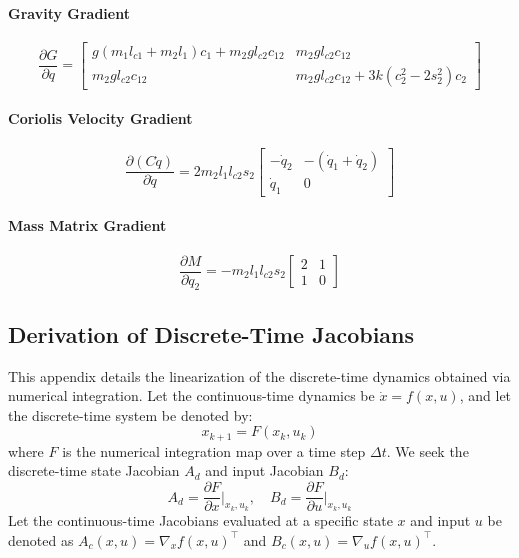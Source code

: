 \paragraph{Gravity Gradient}
\begin{equation}
    \frac{\partial G}{\partial q} = 
    \begin{bmatrix}
        g(m_1 l_{c1} + m_2 l_1)c_1 + m_2 g l_{c2} c_{12} & m_2 g l_{c2} c_{12} \\
        m_2 g l_{c2} c_{12} & m_2 g l_{c2} c_{12} + 3k(c_2^2 - 2s_2^2)c_2
    \end{bmatrix}
\end{equation}

\paragraph{Coriolis Velocity Gradient}
\begin{equation}
    \frac{\partial (C\dot{q})}{\partial \dot{q}} = 
    2 m_2 l_1 l_{c2} s_2
    \begin{bmatrix}
        -\dot{q}_2 & -(\dot{q}_1 + \dot{q}_2) \\
        \dot{q}_1 & 0
    \end{bmatrix}
\end{equation}

\paragraph{Mass Matrix Gradient}
\begin{equation}
    \frac{\partial M}{\partial q_2} = 
    - m_2 l_1 l_{c2} s_2
    \begin{bmatrix}
        2 & 1 \\
        1 & 0
    \end{bmatrix}
\end{equation}

\subsection{Derivation of Discrete-Time Jacobians}
\label{app:discretization_methods}

This appendix details the linearization of the discrete-time dynamics obtained via numerical integration. Let the continuous-time dynamics be $\dot{x} = f(x, u)$, and let the discrete-time system be denoted by:
\begin{equation}
    x_{k+1} = F(x_k, u_k)
\end{equation}
where $F$ is the numerical integration map over a time step $\Delta t$. We seek the discrete-time state Jacobian $A_d$ and input Jacobian $B_d$:
\begin{equation}
    A_d = \frac{\partial F}{\partial x}\bigg|_{x_k, u_k}, \quad B_d = \frac{\partial F}{\partial u}\bigg|_{x_k, u_k}
\end{equation}
Let the continuous-time Jacobians evaluated at a specific state $x$ and input $u$ be denoted as $A_c(x,u) = \nabla_x f(x,u)^\top$ and $B_c(x,u) = \nabla_u f(x,u)^\top$.

